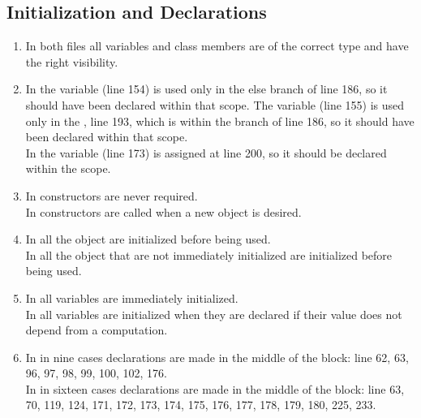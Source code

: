 \subsection{Initialization and Declarations}
\begin{enumerate}[NUM]
    \item In both files all variables and class members are of the correct type and have the right visibility.
   
    \item In  the variable  (line 154) is used only in the else branch of line 186, so it should have been declared within that scope. The variable  (line 155) is used only in the , line 193, which is within the  branch of line 186, so it should have been declared within that scope.\\
    In  the variable  (line 173) is assigned at line 200, so it should be declared within the  scope.
    
    \item In  constructors are never required.\\
    In  constructors are called when a new object is desired.
   
    \item In  all the object are initialized before being used.\\
    In  all the object that are not immediately initialized are initialized before being used.\\
   
    \item In  all variables are immediately initialized.\\
    In  all variables are initialized when they are declared if their value does not depend from a computation.
   
    \item In  in nine cases declarations are made in the middle of the block: line 62, 63, 96, 97, 98, 99, 100, 102, 176.\\
    In  in sixteen cases declarations are made in the middle of the block: line 63, 70, 119, 124, 171, 172, 173, 174, 175, 176, 177, 178, 179, 180, 225, 233.
\end{enumerate}

